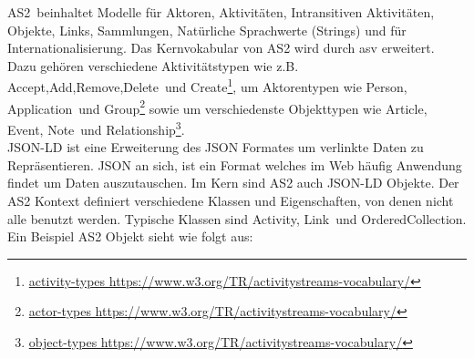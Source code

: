 {		\glqq \gls{AS2}\grqq~beinhaltet Modelle für Aktoren, Aktivitäten, Intransitiven Aktivitäten, Objekte, Links, Sammlungen, Natürliche Sprachwerte (Strings) und für Internationalisierung. Das Kernvokabular von \gls{AS2} wird durch \gls{asv} erweitert. Dazu gehören verschiedene Aktivitätstypen wie z.B. \glqq Accept\grqq,\glqq Add\grqq,\glqq Remove\grqq,\glqq Delete\grqq~und \glqq Create\grqq\footnote{\href{https://www.w3.org/TR/activitystreams-vocabulary/}{activity-types https://www.w3.org/TR/activitystreams-vocabulary/}}, um Aktorentypen wie \glqq Person\grqq, \glqq Application\grqq~und \glqq Group\grqq\footnote{\href{https://www.w3.org/TR/activitystreams-vocabulary/}{actor-types https://www.w3.org/TR/activitystreams-vocabulary/}} sowie um verschiedenste Objekttypen wie \glqq Article\grqq, \glqq Event\grqq, \glqq Note\grqq~und \glqq Relationship\grqq\footnote{\href{https://www.w3.org/TR/activitystreams-vocabulary/}{object-types https://www.w3.org/TR/activitystreams-vocabulary/}}.\\
		
		\gls{JSON-LD} ist eine Erweiterung des JSON Formates um verlinkte Daten zu Repräsentieren. JSON an sich, ist ein Format welches im Web häufig Anwendung findet um Daten auszutauschen. Im Kern sind \gls{AS2} auch \gls{JSON-LD} Objekte. Der \gls{AS2} Kontext definiert verschiedene Klassen und Eigenschaften, von denen nicht alle benutzt werden. Typische Klassen sind \glqq Activity\grqq, \glqq Link\grqq~und \glqq OrderedCollection\grqq. Ein Beispiel \gls{AS2} Objekt sieht wie folgt aus: 	
		
	}
